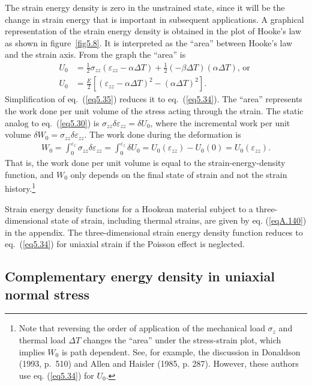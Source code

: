 \documentclass{AeroStructure-ERJohnson}
\begin{document}
\noindent The strain energy density is zero in the unstrained state, since it will be the change in strain energy that is important in subsequent applications. A graphical representation of the strain energy density is obtained in the plot of Hooke's law as shown in figure~\ref{fig5.8}. It is interpreted as the ``area'' between Hooke's law and the strain axis. From the graph the ``area'' is
\begin{align}
U_{0}&=\frac{1}{2} \sigma_{z z}\left(\varepsilon_{z z}-\alpha \Delta T\right)+\frac{1}{2}(-\beta \Delta T)(\alpha \Delta T)\mbox{, or } \nonumber\\
U_{0}&=\frac{E}{2}\left[\left(\varepsilon_{z z}-\alpha \Delta T\right)^{2}-(\alpha \Delta T)^{2}\right]. \label{eq5.35}
\end{align}
Simplification of eq.~(\ref{eq5.35}) reduces it to eq.~(\ref{eq5.34}). The ``area'' represents the work done per unit volume of the stress acting through the strain. The static analog to eq.~(\ref{eq5.30}) is $\sigma_{z z} \delta \varepsilon_{z z}=\delta U_{0}$, where the incremental work per unit volume $\delta W_{0}=\sigma_{z z} \delta \varepsilon_{z z}$. The work done during the deformation is
\begin{align}\label{eq5.36}
W_{0}=\int_{0}^{\varepsilon_{z}} \sigma_{z z} \delta \varepsilon_{z z}=\int_{0}^{\varepsilon_{z}} \delta U_{0}=U_{0}\left(\varepsilon_{z z}\right)-U_{0}(0)=U_{0}\left(\varepsilon_{z z}\right).
\end{align}
That is, the work done per unit volume is equal to the strain-energy-density function, and $W_0$ only depends on the final state of strain and not the strain history.\footnote{Note that reversing the order of application of the mechanical load $\sigma_z$ and thermal load $\Delta T$ changes the ``area'' under the stress-strain plot, which implies $W_0$ is path dependent. See, for example, the discussion in Donaldson (1993, p.~510) and Allen and Haisler (1985, p. 287). However, these authors use eq. (\ref{eq5.34}) for $U_0$.}

Strain energy density functions for a Hookean material subject to a three-dimensional state of strain, including thermal strains, are given by eq. (\ref{eqA.140}) in the appendix. The three-dimensional strain energy density function reduces to eq.~(\ref{eq5.34}) for uniaxial strain if the Poisson effect is neglected.

\subsection{Complementary energy density in uniaxial normal stress}\label{sec5.3.2}
\end{document}
